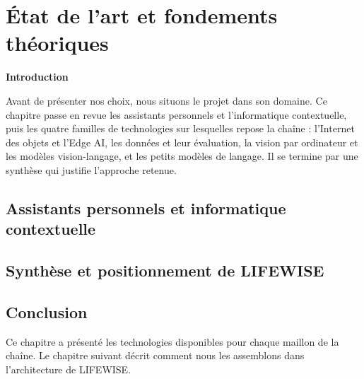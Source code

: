\chapter{\textcolor{mycolor}{\textbf{État de l'art et fondements théoriques}}}
\fancyhf{}
\fancyhead[L]{\small\itshape\nouppercase{\rightmark}}
\fancyfoot[L]{\small\itshape\nouppercase{\leftmark}}
\fancyfoot[R]{\small\itshape\thepage}
\renewcommand{\headrulewidth}{1pt}
\renewcommand{\footrulewidth}{0.4pt}

\vfill
\begin{flushright}{\Large\bfseries\textcolor{mycolor}{Introduction}}\end{flushright}

Avant de présenter nos choix, nous situons le projet dans son domaine. Ce chapitre passe en revue les assistants personnels et l'informatique contextuelle, puis les quatre familles de technologies sur lesquelles repose la chaîne : l'Internet des objets et l'Edge AI, les données et leur évaluation, la vision par ordinateur et les modèles vision-langage, et les petits modèles de langage. Il se termine par une synthèse qui justifie l'approche retenue.

\clearpage

\section{Assistants personnels et informatique contextuelle}










\section{Synthèse et positionnement de LIFEWISE}



\section*{Conclusion}

Ce chapitre a présenté les technologies disponibles pour chaque maillon de la chaîne. Le chapitre suivant décrit comment nous les assemblons dans l'architecture de LIFEWISE.
